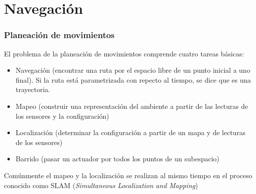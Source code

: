 \section[Navegación]{Navegación}

\begin{frame}\frametitle{Planeación de movimientos}
  El problema de la planeación de movimientos comprende cuatro tareas básicas:
  \begin{itemize}
  \item Navegación (encontrar una ruta por el espacio libre de un punto inicial a uno final). Si la ruta está parametrizada con repecto al tiempo, se dice que es una trayectoria.
  \item Mapeo (construir una representación del ambiente a partir de las lecturas de los sensores y la configuración)
  \item Localización (determinar la configuración a partir de un mapa y de lecturas de los sensores)
  \item Barrido (pasar un actuador por todos los puntos de un subespacio)
  \end{itemize}
  Comúnmente el mapeo y la localización se realizan al mismo tiempo en el proceso conocido como SLAM (\textit{Simultaneous Localization and Mapping})
\end{frame}

